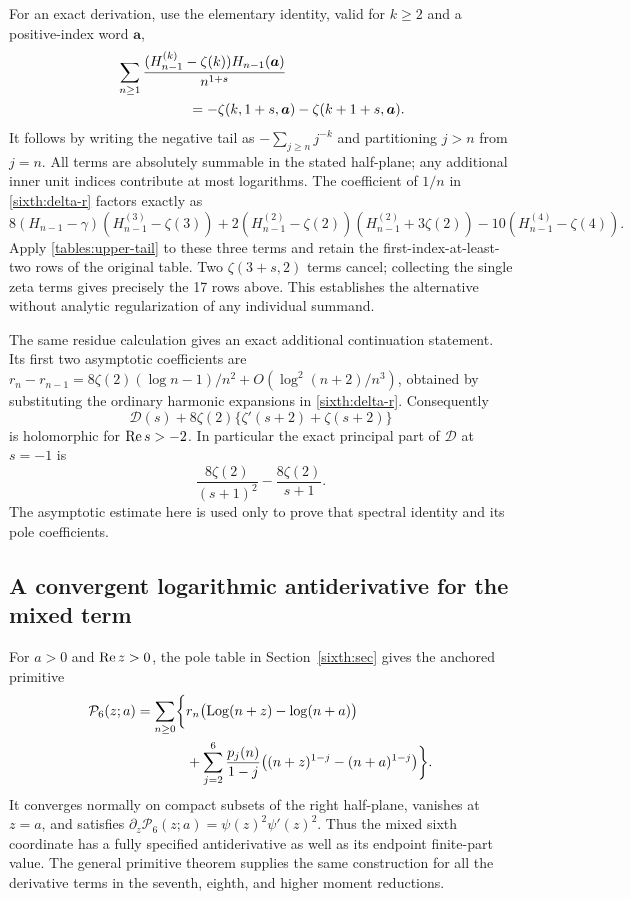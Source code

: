 For an exact derivation, use the elementary identity, valid for
$k\ge2$ and a positive-index word $\boldsymbol a$,
\begin{equation}\label{tables:upper-tail}
 \begin{split}
 &\sum_{n\ge1}\frac{(H_{n-1}^{(k)}-\zeta(k))
                             H_{n-1}(\boldsymbol a)}{n^{1+s}}\\
 &\hspace{18mm}=-\zeta(k,1+s,\boldsymbol a)
                -\zeta(k+1+s,\boldsymbol a).
 \end{split}
\end{equation}
It follows by writing the negative tail as
$-\sum_{j\ge n}j^{-k}$ and partitioning $j>n$ from $j=n$.
All terms are absolutely summable in the stated half-plane; any
additional inner unit indices contribute at most logarithms.
The coefficient of $1/n$ in \eqref{sixth:delta-r} factors exactly as
\[
 8(H_{n-1}-\gamma)(H_{n-1}^{(3)}-\zeta(3))
 +2(H_{n-1}^{(2)}-\zeta(2))(H_{n-1}^{(2)}+3\zeta(2))
 -10(H_{n-1}^{(4)}-\zeta(4)).
\]
Apply \eqref{tables:upper-tail} to these three terms and retain
the first-index-at-least-two rows of the original table.
Two $\zeta(3+s,2)$ terms cancel; collecting the single zeta terms
gives precisely the 17 rows above.  This establishes the alternative
without analytic regularization of any individual summand.

The same residue calculation gives an exact additional continuation
statement.  Its first two asymptotic coefficients are
$r_n-r_{n-1}=8\zeta(2)(\log n-1)/n^2+
O(\log^2(n+2)/n^3)$, obtained by substituting the ordinary harmonic
expansions in \eqref{sixth:delta-r}.  Consequently
\[
 \mathcal D(s)+8\zeta(2)\{\zeta'(s+2)+\zeta(s+2)\}
\]
is holomorphic for $\operatorname{Re} s>-2$.  In particular the exact principal
part of $\mathcal D$ at $s=-1$ is
\[
 \frac{8\zeta(2)}{(s+1)^2}-\frac{8\zeta(2)}{s+1}.
\]
The asymptotic estimate here is used only to prove that spectral
identity and its pole coefficients.

\subsection{A convergent logarithmic antiderivative for the mixed term}

For $a>0$ and $\operatorname{Re} z>0$, the pole table in Section~\ref{sixth:sec}
gives the anchored primitive
\begin{equation}\label{tables:primitive6}
 \begin{split}
 \mathcal P_6(z;a)=\sum_{n\ge0}\biggl\{
 &r_n\bigl(\operatorname{Log}(n+z)-\log(n+a)\bigr)\\
 &+\sum_{j=2}^6\frac{p_j(n)}{1-j}
       \bigl((n+z)^{1-j}-(n+a)^{1-j}\bigr)\biggr\}.
 \end{split}
\end{equation}
It converges normally on compact subsets of the right half-plane,
vanishes at $z=a$, and satisfies
$\partial_z\mathcal P_6(z;a)=\psi(z)^2\psi'(z)^2$.
Thus the mixed sixth coordinate has a fully specified antiderivative
as well as its endpoint finite-part value.  The general primitive
theorem supplies the same construction for all the derivative terms
in the seventh, eighth, and higher moment reductions.
